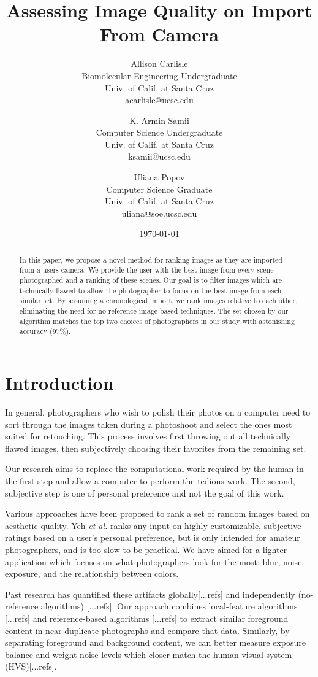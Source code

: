 \documentclass[twocolumn]{article}
\title{
   Assessing Image Quality on Import From Camera
} %
\author{
   Allison Carlisle\\
   Biomolecular Engineering Undergraduate\\
   Univ. of Calif. at Santa Cruz\\
   acarlisle@ucsc.edu
  \and
   K. Armin Samii\\
   Computer Science Undergraduate\\
   Univ. of Calif. at Santa Cruz\\
   ksamii@ucsc.edu
  \and
   Uliana Popov\\
   Computer Science Graduate\\
   Univ. of Calif. at Santa Cruz\\
   uliana@soe.ucsc.edu
}
\date{\today}
\begin{document}
\maketitle

\begin{abstract}
In this paper, we propose a novel method for ranking images as they are imported from a users camera. We provide the user with the best image from every scene photographed and a ranking of these scenes. Our goal is to filter images which are technically flawed to allow the photographer to focus on the best image from each similar set. By assuming a chronological import, we rank images relative to each other, eliminating the need for no-reference image based techniques. The set chosen by our algorithm matches the top two choices of photographers in our study with astonishing accuracy (97\%).
\end{abstract}

\section{Introduction}
In general, photographers who wish to polish their photos on a computer need to sort through the images taken during a photoshoot and select the ones most suited for retouching. This process involves first throwing out all technically flawed images, then subjectively choosing their favorites from the remaining set.

Our research aims to replace the computational work required by the human in the first step and allow a computer to perform the tedious work. The second, subjective step is one of personal preference and not the goal of this work.

Various approaches have been proposed to rank a set of random images based on aesthetic quality. Yeh \textit{et al.}\cite{Yeh:2010:PPR:1873951.1873963} ranks any input on highly customizable, subjective ratings based on a user's personal preference, but is only intended for amateur photographers, and is too slow to be practical. We have aimed for a lighter application which focuses on what photographers look for the most: blur, noise, exposure, and the relationship between colors.

Past research has quantified these artifacts globally[...refs] and independently (no-reference algorithms) [...refs]. Our approach combines local-feature algorithms [...refs] and reference-based algorithms [...refs] to extract similar foreground content in near-duplicate photographs and compare that data. Similarly, by separating foreground and background content, we can better measure exposure balance and weight noise levels which closer match the human visual system (HVS)[...refs].
\end{document}
